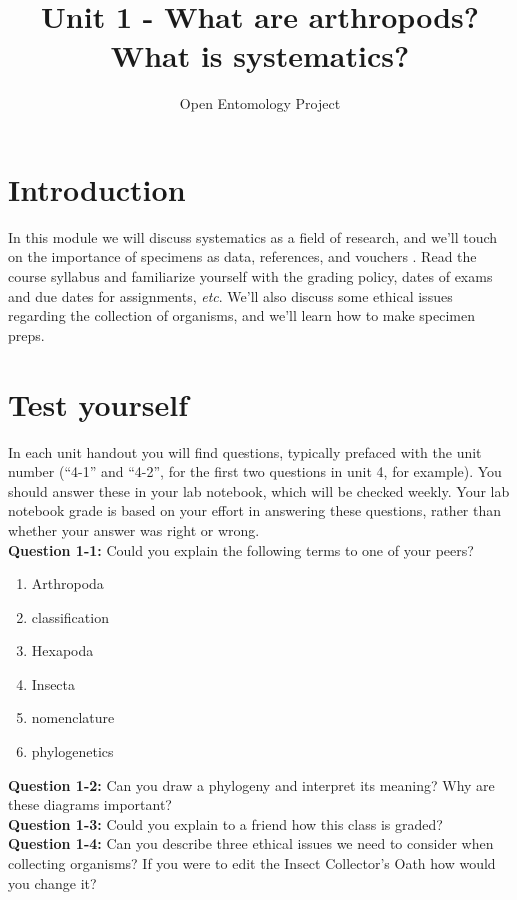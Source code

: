 \documentclass[11pt,letterpaper]{article}
\title{Unit 1 - What are arthropods? What is systematics?}
\author{Open Entomology Project}
\begin{document}
\cleanlookdateon %
\maketitle
\thispagestyle{fancy}
\section*{Introduction}
In this module we will discuss systematics as a field of research, and we'll touch on the importance of specimens as data, references, and vouchers \citep{vouchers}. Read the course syllabus and familiarize yourself with the grading policy, dates of exams and due dates for assignments, \textit{etc}. We'll also discuss some ethical issues regarding the collection of organisms, and we'll learn how to make specimen preps.

\section*{Test yourself}
In each unit handout you will find questions, typically prefaced with the unit number (``4-1'' and ``4-2'', for the first two questions in unit 4, for example). You should answer these in your lab notebook, which will be checked weekly. Your lab notebook grade is based on your effort in answering these questions, rather than whether your answer was right or wrong.\\

\noindent\textbf{Question 1-1:} Could you explain the following terms to one of your peers?
\begin{enumerate} 
\item Arthropoda
\item classification
\item Hexapoda
\item Insecta
\item nomenclature
\item phylogenetics 
\end{enumerate}

\noindent{}\textbf{Question 1-2:} Can you draw a phylogeny and interpret its meaning? Why are these diagrams important?\\

\noindent{}\textbf{Question 1-3:} Could you explain to a friend how this class is graded?\\

\noindent{}\textbf{Question 1-4:} Can you describe three ethical issues we need to consider when collecting organisms? If you were to edit the Insect Collector's Oath \citep{oath} how would you change it?



\end{document}
